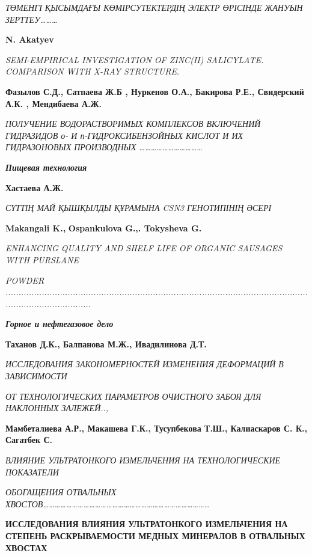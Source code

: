 \emph{ТӨМЕНГІ ҚЫСЫМДАҒЫ КӨМІРСУТЕКТЕРДІҢ ЭЛЕКТР ӨРІСІНДЕ ЖАНУЫН
ЗЕРТТЕУ\ldots\ldots\ldots{}}

{\bfseries N. Akatyev}

\emph{SEMI-EMPIRICAL INVESTIGATION OF ZINC(II) SALICYLATE. COMPARISON
WITH X-RAY STRUCTURE.}

{\bfseries Фазылов С.Д., Сатпаева Ж.Б , Нуркенов О.А., Бакирова Р.Е.,
Свидерский А.К. , Мендибаева А.Ж.}

\emph{ПОЛУЧЕНИЕ ВОДОРАСТВОРИМЫХ КОМПЛЕКСОВ ВКЛЮЧЕНИЙ ГИДРАЗИДОВ о- И
п-ГИДРОКСИБЕНЗОЙНЫХ КИСЛОТ И ИХ ГИДРАЗОНОВЫХ ПРОИЗВОДНЫХ
\ldots\ldots\ldots\ldots\ldots\ldots\ldots\ldots\ldots\ldots\ldots{}}

\emph{{\bfseries Пищевая технология}}

{\bfseries Хастаева А.Ж.}

\emph{СҮТТІҢ МАЙ ҚЫШҚЫЛДЫ ҚҰРАМЫНА CSN3 ГЕНОТИПІНІҢ ӘСЕРІ}

{\bfseries Makangali K.,} {\bfseries Ospankulova G.,. Tokysheva G.}

\emph{ENHANCING QUALITY AND SHELF LIFE OF ORGANIC SAUSAGES WITH
PURSLANE}

\emph{POWDER
......................................................................................................................................................}

\emph{{\bfseries Горное и нефтегазовое дело}}

{\bfseries Таханов Д.К., Балпанова М.Ж., Ивадилинова Д.Т.}

\emph{ИССЛЕДОВАНИЯ ЗАКОНОМЕРНОСТЕЙ ИЗМЕНЕНИЯ ДЕФОРМАЦИЙ В ЗАВИСИМОСТИ}

\emph{ОТ ТЕХНОЛОГИЧЕСКИХ ПАРАМЕТРОВ ОЧИСТНОГО ЗАБОЯ ДЛЯ НАКЛОННЫХ
ЗАЛЕЖЕЙ..,}

{\bfseries Мамбеталиева А.Р., Макашева Г.К., Тусупбекова Т.Ш., Калиаскаров
С. К., Сагатбек С.}

\emph{ВЛИЯНИЕ УЛЬТРАТОНКОГО ИЗМЕЛЬЧЕНИЯ НА ТЕХНОЛОГИЧЕСКИЕ ПОКАЗАТЕЛИ}

\emph{ОБОГАЩЕНИЯ ОТВАЛЬНЫХ
ХВОСТОВ\ldots\ldots\ldots\ldots\ldots\ldots\ldots\ldots\ldots\ldots\ldots\ldots\ldots\ldots\ldots\ldots\ldots\ldots\ldots\ldots\ldots\ldots\ldots\ldots\ldots\ldots\ldots\ldots\ldots{}}

{\bfseries ИССЛЕДОВАНИЯ ВЛИЯНИЯ УЛЬТРАТОНКОГО ИЗМЕЛЬЧЕНИЯ НА СТЕПЕНЬ
РАСКРЫВАЕМОСТИ МЕДНЫХ МИНЕРАЛОВ В ОТВАЛЬНЫХ ХВОСТАХ}



